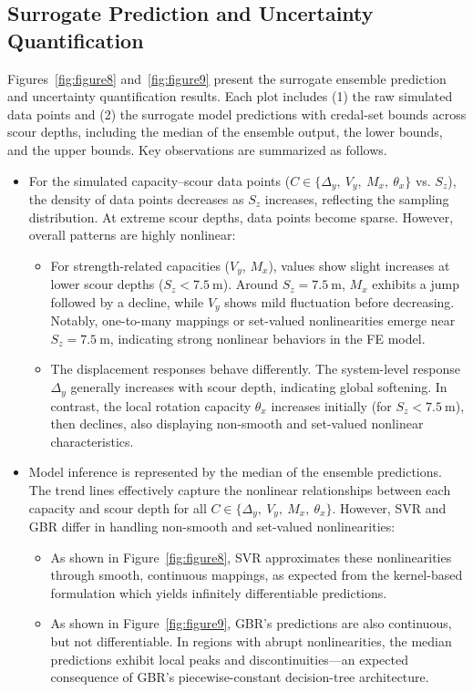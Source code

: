 \documentclass[authoryear,preprint,review,12pt]{elsarticle}
\begin{document}
\subsection{Surrogate Prediction and Uncertainty Quantification}
Figures~\ref{fig:figure8} and~\ref{fig:figure9} present the surrogate ensemble prediction and uncertainty quantification results. Each plot includes (1) the raw simulated data points and (2) the surrogate model predictions with credal-set bounds across scour depths, including the median of the ensemble output, the lower bounds, and the upper bounds. Key observations are summarized as follows.
\begin{itemize}
    \item For the simulated capacity–scour data points ($C \in \{\Delta_y,\ V_y,\ M_x,\ \theta_x\}$ vs. $S_z$), the density of data points decreases as $S_z$ increases, reflecting the sampling distribution. At extreme scour depths, data points become sparse. However, overall patterns are highly nonlinear:
    \begin{itemize}
        \item For strength-related capacities ($V_y$, $M_x$), values show slight increases at lower scour depths ($S_z < 7.5\ \mathrm{m}$). Around $S_z = 7.5\ \mathrm{m}$, $M_x$ exhibits a jump followed by a decline, while $V_y$ shows mild fluctuation before decreasing. Notably, one-to-many mappings or set-valued nonlinearities emerge near $S_z = 7.5\ \mathrm{m}$, indicating strong nonlinear behaviors in the FE model.
        \item The displacement responses behave differently. The system-level response $\Delta_y$ generally increases with scour depth, indicating global softening. In contrast, the local rotation capacity $\theta_x$ increases initially (for $S_z < 7.5\ \mathrm{m}$), then declines, also displaying non-smooth and set-valued nonlinear characteristics.
    \end{itemize}
    
    \item Model inference is represented by the median of the ensemble predictions. The trend lines effectively capture the nonlinear relationships between each capacity and scour depth for all $C \in \{\Delta_y,\ V_y,\ M_x,\ \theta_x\}$. However, SVR and GBR differ in handling non-smooth and set-valued nonlinearities:
    \begin{itemize}
        \item As shown in Figure~\ref{fig:figure8}, SVR approximates these nonlinearities through smooth, continuous mappings, as expected from the kernel-based formulation which yields infinitely differentiable predictions.
        \item As shown in Figure~\ref{fig:figure9}, GBR's predictions are also continuous, but not differentiable. In regions with abrupt nonlinearities, the median predictions exhibit local peaks and discontinuities—an expected consequence of GBR's piecewise-constant decision-tree architecture.
    \end{itemize}
    

\end{itemize}
\end{document}

